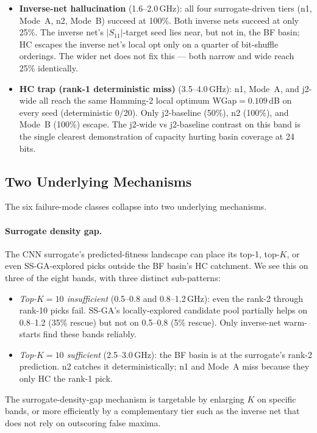 \begin{itemize}
\item \textbf{Inverse-net hallucination} (1.6--2.0\,GHz): all four
surrogate-driven tiers (n1, Mode~A, n2, Mode~B) succeed at 100\%.
Both inverse nets succeed at only 25\%. The inverse net's
$|S_{11}|$-target seed lies near, but not in, the BF basin; HC
escapes the inverse net's local opt only on a quarter of bit-shuffle
orderings. The wider net does not fix this --- both narrow and
wide reach 25\% identically.

\item \textbf{HC trap (rank-1 deterministic miss)} (3.5--4.0\,GHz):
n1, Mode~A, and j2-wide all reach the same Hamming-2 local optimum
WGap${=}0.109$\,dB on every seed (deterministic 0/20). Only
j2-baseline (50\%), n2 (100\%), and Mode~B (100\%) escape. The
j2-wide vs j2-baseline contrast on this band is the single
clearest demonstration of capacity hurting basin coverage at 24
bits.
\end{itemize}

\subsection{Two Underlying Mechanisms}

The six failure-mode classes collapse into two underlying mechanisms.

\paragraph{Surrogate density gap.}
The CNN surrogate's predicted-fitness landscape can place its top-1,
top-$K$, or even SS-GA-explored picks outside the BF basin's HC
catchment. We see this on three of the eight bands, with three
distinct sub-patterns:
\begin{itemize}
\item \emph{Top-$K{=}10$ insufficient} (0.5--0.8 and 0.8--1.2\,GHz):
even the rank-2 through rank-10 picks fail. SS-GA's locally-explored
candidate pool partially helps on 0.8--1.2 (35\% rescue) but not on
0.5--0.8 (5\% rescue). Only inverse-net warm-starts find these bands
reliably.
\item \emph{Top-$K{=}10$ sufficient} (2.5--3.0\,GHz): the BF basin
is at the surrogate's rank-2 prediction. n2 catches it deterministically;
n1 and Mode~A miss because they only HC the rank-1 pick.
\end{itemize}
The surrogate-density-gap mechanism is targetable by enlarging $K$
on specific bands, or more efficiently by a complementary tier such
as the inverse net that does not rely on outscoring false maxima.

